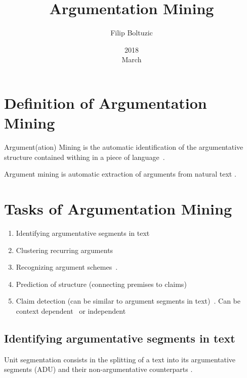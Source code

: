 \documentclass[a4paper,10pt]{article}
\title{Argumentation Mining}
\author{Filip Boltuzic}
\date{2018 \\ March}
\begin{document}
\maketitle

\tableofcontents

\section{Definition of Argumentation Mining}

Argument(ation) Mining is the automatic identification of the argumentative
structure contained withing in a piece of language~\cite{Lawrence2017}.

Argument mining is automatic extraction of arguments from natural text
\cite{Aker2017}.

\section{Tasks of Argumentation Mining}

\begin{enumerate}
  \item Identifying argumentative segments in text~\cite{Ajjour2017, stab2017argumentative}

  \item Clustering recurring arguments~\cite{boltuvzic2015identifying,
   misra2017using} 
   
  \item Recognizing argument schemes~\cite{feng2011classifying}. 

  \item Prediction of structure (connecting premises to claims)~\cite{Aker2017,
   Lawrence2017}

 \item Claim detection (can be similar to argument segments in text)~\cite{Levy2017}. 
   Can be context dependent~\cite{levy2014context} or independent~\cite{lippi2015context}
   
\end{enumerate}

\subsection{Identifying argumentative segments in text}
\label{subsec:argseg}

\noindent Unit segmentation consists in the splitting of a text into its
argumentative segments (ADU) and their non-argumentative counterparts 
\cite{Ajjour2017}.
\end{document}
